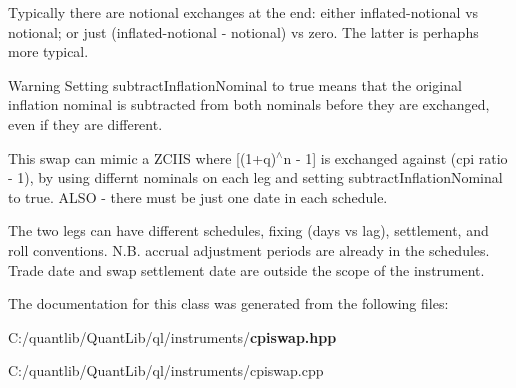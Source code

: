 Typically there are notional exchanges at the end\+: either inflated-\/notional vs notional; or just (inflated-\/notional -\/ notional) vs zero. The latter is perhaphs more typical. \begin{DoxyWarning}{Warning}
Setting subtract\+Inflation\+Nominal to true means that the original inflation nominal is subtracted from both nominals before they are exchanged, even if they are different.
\end{DoxyWarning}
This swap can mimic a Z\+C\+I\+IS where [(1+q)$^\wedge$n -\/ 1] is exchanged against (cpi ratio -\/ 1), by using differnt nominals on each leg and setting subtract\+Inflation\+Nominal to true. A\+L\+SO -\/ there must be just one date in each schedule.

The two legs can have different schedules, fixing (days vs lag), settlement, and roll conventions. N.\+B. accrual adjustment periods are already in the schedules. Trade date and swap settlement date are outside the scope of the instrument. 

The documentation for this class was generated from the following files\+:\begin{DoxyCompactItemize}
\item 
C\+:/quantlib/\+Quant\+Lib/ql/instruments/{\bf cpiswap.\+hpp}\item 
C\+:/quantlib/\+Quant\+Lib/ql/instruments/cpiswap.\+cpp\end{DoxyCompactItemize}
